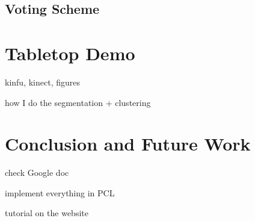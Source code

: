 \documentclass{article}
\begin{document}
\subsection {Voting Scheme}


\section {Tabletop Demo}
\label{sec:tabletop_demo} 

kinfu, kinect, figures

how I do the segmentation + clustering


\section {Conclusion and Future Work}
\label{sec:conclusion}

check Google doc

implement everything in PCL

tutorial on the website




\end{document}
